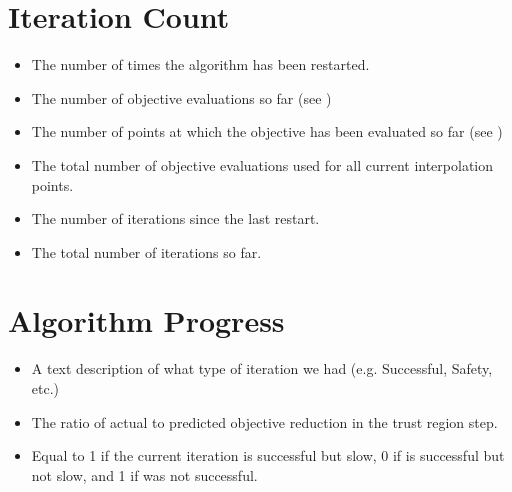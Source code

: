 \documentclass[letterpaper,10pt,english]{sphinxmanual}
\begin{document}
\section{Iteration Count}
\label{\detokenize{diagnostic:iteration-count}}\begin{itemize}
\item {} 
\sphinxAtStartPar
{} \sphinxhyphen{} The number of times the algorithm has been restarted.

\item {} 
\sphinxAtStartPar
{} \sphinxhyphen{} The number of objective evaluations so far (see )

\item {} 
\sphinxAtStartPar
{} \sphinxhyphen{} The number of points at which the objective has been evaluated so far (see )

\item {} 
\sphinxAtStartPar
{} \sphinxhyphen{} The total number of objective evaluations used for all current interpolation points.

\item {} 
\sphinxAtStartPar
{} \sphinxhyphen{} The number of iterations since the last restart.

\item {} 
\sphinxAtStartPar
{} \sphinxhyphen{} The total number of iterations so far.

\end{itemize}


\section{Algorithm Progress}
\label{\detokenize{diagnostic:algorithm-progress}}\begin{itemize}
\item {} 
\sphinxAtStartPar
{} \sphinxhyphen{} A text description of what type of iteration we had (e.g. Successful, Safety, etc.)

\item {} 
\sphinxAtStartPar
{} \sphinxhyphen{} The ratio of actual to predicted objective reduction in the trust region step.

\item {} 
\sphinxAtStartPar
{} \sphinxhyphen{} Equal to 1 if the current iteration is successful but slow, 0 if is successful but not slow, and \sphinxhyphen{}1 if was not successful.

\end{itemize}
\end{document}
